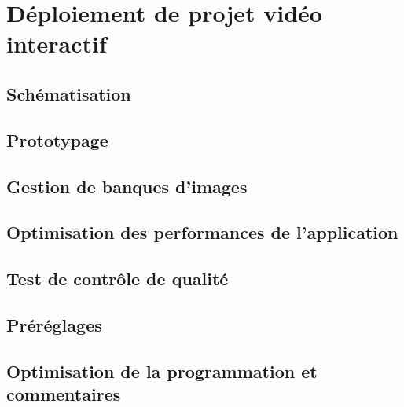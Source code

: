 \documentclass[
]{book}
\begin{document}
\hypertarget{duxe9ploiement-de-projet-viduxe9o-interactif}{%
\chapter{Déploiement de projet vidéo interactif}\label{duxe9ploiement-de-projet-viduxe9o-interactif}}

\hypertarget{schuxe9matisation}{%
\section{Schématisation}\label{schuxe9matisation}}

\hypertarget{prototypage}{%
\section{Prototypage}\label{prototypage}}

\hypertarget{gestion-de-banques-dimages}{%
\section{Gestion de banques d'images}\label{gestion-de-banques-dimages}}

\hypertarget{optimisation-des-performances-de-lapplication}{%
\section{Optimisation des performances de l'application}\label{optimisation-des-performances-de-lapplication}}

\hypertarget{test-de-contruxf4le-de-qualituxe9}{%
\section{Test de contrôle de qualité}\label{test-de-contruxf4le-de-qualituxe9}}

\hypertarget{pruxe9ruxe9glages}{%
\section{Préréglages}\label{pruxe9ruxe9glages}}

\hypertarget{optimisation-de-la-programmation-et-commentaires}{%
\section{Optimisation de la programmation et commentaires}\label{optimisation-de-la-programmation-et-commentaires}}
\end{document}
